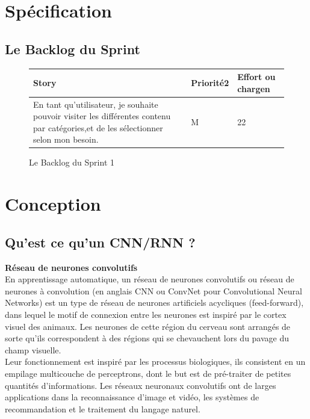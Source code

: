 \section{Spécification}
\subsection{Le Backlog du Sprint}
\begin{figure}[H]
\begin{tabular}{|p{7cm}|p{4cm}|p{4cm}|}
\hline
\textbf{Story} & \textbf{Priorité2 } & \textbf{Effort ou chargen} \\
\hline
En tant qu'utilisateur, je souhaite pouvoir visiter les différentes contenu par catégories,et de les sélectionner selon mon besoin. & \begin{center}M\end{center} & \begin{center}22\end{center}\\
\hline
\end{tabular}
  \caption{Le Backlog du Sprint 1}
  \label{fig:Backlog1}
\end{figure}


\section{Conception}

\subsection{Qu'est ce qu'un CNN/RNN ?}
\textbf{Réseau de neurones convolutifs}\\[0.5cm]
En apprentissage automatique, un réseau de neurones convolutifs ou réseau de neurones à convolution (en anglais CNN ou ConvNet pour Convolutional Neural Networks) est un type de réseau de neurones artificiels acycliques (feed-forward), dans lequel le motif de connexion entre les neurones est inspiré par le cortex visuel des animaux. Les neurones de cette région du cerveau sont arrangés de sorte qu'ils correspondent à des régions qui se chevauchent lors du pavage du champ visuelle.\\[0.2cm]
 Leur fonctionnement est inspiré par les processus biologiques, ils consistent en un empilage multicouche de perceptrons, dont le but est de pré-traiter de petites quantités d'informations. Les réseaux neuronaux convolutifs ont de larges applications dans la reconnaissance d'image et vidéo, les systèmes de recommandation et le traitement du langage naturel.\\[1cm]

